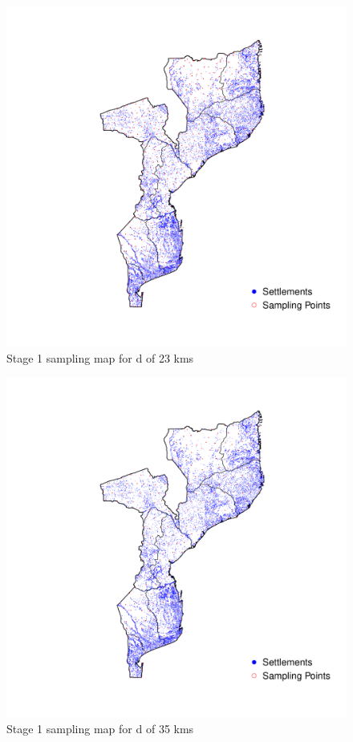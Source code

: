 \documentclass[
  12pt,
  a4paper]{article}
\begin{document}
\begin{figure}[H]

{\centering \includegraphics{mozambiqueNotes_files/figure-latex/stage1plot23-1} 

}

\caption{Stage 1 sampling map for d of 23 kms}\label{fig:stage1plot23}
\end{figure}

\begin{figure}[H]

{\centering \includegraphics{mozambiqueNotes_files/figure-latex/stage1plot35-1} 

}

\caption{Stage 1 sampling map for d of 35 kms}\label{fig:stage1plot35}
\end{figure}

  
\end{document}
